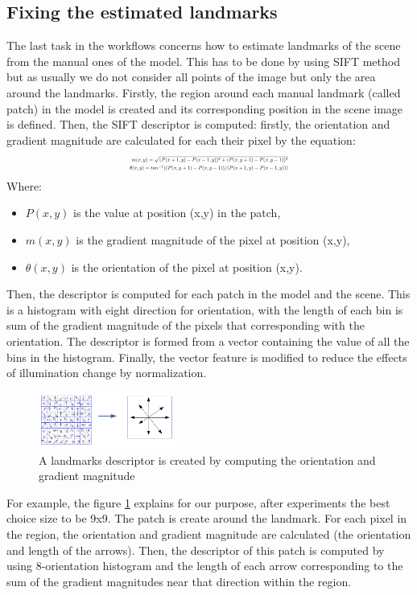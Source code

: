 \documentclass[twoside,twocolumn,10pt]{article}
\begin{document}
\subsection{Fixing the estimated landmarks}
The last task in the workflows concerns how to estimate landmarks of the scene from the manual ones of the model. This has to be done by using SIFT\cite{lowe2004distinctive} method but as usually we do not consider all points of the image but only the area around the landmarks. Firstly, the region around each manual landmark (called patch) in the model is created and its corresponding position in the scene image is defined. Then, the SIFT descriptor is computed: firstly, the orientation and gradient magnitude are calculated for each their pixel by the equation:
\begin{equation}
\label{eq:sift}
\resizebox{.41 \textwidth}{!} 
{$
\begin{aligned}
	m(x,y) = \sqrt{(P(x+1,y) - P(x-1,y))^2 + (P(x,y+1) - P(x,y-1))^2} \\
	\theta(x,y) = tan^{-1}((P(x,y+1) - P(x,y-1))/(P(x+1,y) - P(x-1,y)))
	\end{aligned}
$}
\end{equation}
Where:
\begin{itemize}
	\item $P(x,y)$ is the value at position (x,y) in the patch,
	\item $m(x,y)$ is the gradient magnitude of the pixel at position (x,y),
	\item $\theta(x,y)$ is the orientation of the pixel at position (x,y).
\end{itemize}
Then, the descriptor is computed for each patch in the model and the scene. This is a histogram with eight direction for orientation, with the length of each bin is sum of the gradient magnitude of the pixels that corresponding  with the orientation. The descriptor is formed from a vector containing the value of all the bins in the histogram. Finally, the vector feature is modified to reduce the effects of illumination change by normalization.

\begin{figure}[htb]
    \centering
    \includegraphics[width=0.4\textwidth]{./images/keypoint_descriptor}
    \caption{A landmarks descriptor is created by computing the orientation and gradient magnitude}
    \label{fig:kpdescriptor}
\end{figure}
For example, the figure \ref{fig:kpdescriptor} explains for our purpose, after experiments the best choice size to be 9x9. The patch is create around the landmark. For each pixel in the region, the orientation and gradient magnitude are calculated (the orientation and length of the arrows). 
Then, the descriptor of this patch is computed by using 8-orientation histogram and the length of each arrow corresponding to the sum of the gradient magnitudes near that direction within the region.\\
\end{document}
